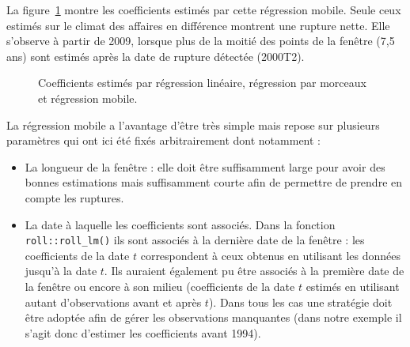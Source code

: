 \documentclass[
  a4paper,
  DIV=11,
  numbers=noendperiod,
  french]{scrartcl}
\newcommand\1{{\mathds 1}}
\theoremstyle{remark}
\begin{document}
La figure~\ref{fig-coef-rollreg} montre les coefficients estimés par
cette régression mobile. Seule ceux estimés sur le climat des affaires
en différence montrent une rupture nette. Elle s'observe à partir de
2009, lorsque plus de la moitié des points de la fenêtre (7,5 ans) sont
estimés après la date de rupture détectée (2000T2).

\begin{figure}

\caption{\label{fig-coef-rollreg}Coefficients estimés par régression
linéaire, régression par morceaux et régression mobile.}


\end{figure}%

La régression mobile a l'avantage d'être très simple mais repose sur
plusieurs paramètres qui ont ici été fixés arbitrairement dont notamment
:

\begin{itemize}
\item
  La longueur de la fenêtre : elle doit être suffisamment large pour
  avoir des bonnes estimations mais suffisamment courte afin de
  permettre de prendre en compte les ruptures.
\item
  La date à laquelle les coefficients sont associés. Dans la fonction
  \texttt{roll::roll\_lm()} ils sont associés à la dernière date de la
  fenêtre : les coefficients de la date \(t\) correspondent à ceux
  obtenus en utilisant les données jusqu'à la date \(t.\) Ils auraient
  également pu être associés à la première date de la fenêtre ou encore
  à son milieu (coefficients de la date \(t\) estimés en utilisant
  autant d'observations avant et après \(t\)). Dans tous les cas une
  stratégie doit être adoptée afin de gérer les observations manquantes
  (dans notre exemple il s'agit donc d'estimer les coefficients avant
  1994).
\end{itemize}
\end{document}
